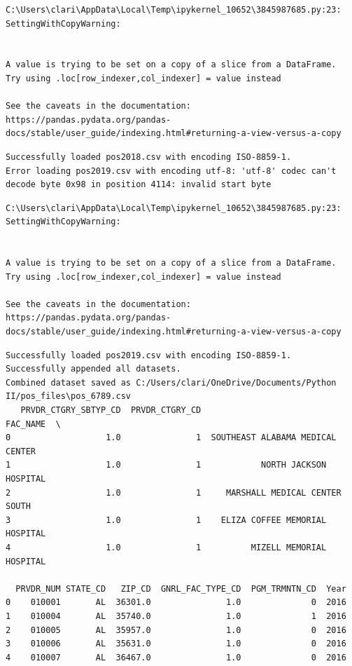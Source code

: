 \documentclass[
  letterpaper,
  DIV=11,
  numbers=noendperiod]{scrartcl}
\begin{document}
\begin{verbatim}
C:\Users\clari\AppData\Local\Temp\ipykernel_10652\3845987685.py:23: SettingWithCopyWarning:


A value is trying to be set on a copy of a slice from a DataFrame.
Try using .loc[row_indexer,col_indexer] = value instead

See the caveats in the documentation: https://pandas.pydata.org/pandas-docs/stable/user_guide/indexing.html#returning-a-view-versus-a-copy
\end{verbatim}

\begin{verbatim}
Successfully loaded pos2018.csv with encoding ISO-8859-1.
Error loading pos2019.csv with encoding utf-8: 'utf-8' codec can't decode byte 0x98 in position 4114: invalid start byte
\end{verbatim}

\begin{verbatim}
C:\Users\clari\AppData\Local\Temp\ipykernel_10652\3845987685.py:23: SettingWithCopyWarning:


A value is trying to be set on a copy of a slice from a DataFrame.
Try using .loc[row_indexer,col_indexer] = value instead

See the caveats in the documentation: https://pandas.pydata.org/pandas-docs/stable/user_guide/indexing.html#returning-a-view-versus-a-copy
\end{verbatim}

\begin{verbatim}
Successfully loaded pos2019.csv with encoding ISO-8859-1.
Successfully appended all datasets.
Combined dataset saved as C:/Users/clari/OneDrive/Documents/Python II/pos_files\pos_6789.csv
   PRVDR_CTGRY_SBTYP_CD  PRVDR_CTGRY_CD                          FAC_NAME  \
0                   1.0               1  SOUTHEAST ALABAMA MEDICAL CENTER   
1                   1.0               1            NORTH JACKSON HOSPITAL   
2                   1.0               1     MARSHALL MEDICAL CENTER SOUTH   
3                   1.0               1    ELIZA COFFEE MEMORIAL HOSPITAL   
4                   1.0               1          MIZELL MEMORIAL HOSPITAL   

  PRVDR_NUM STATE_CD   ZIP_CD  GNRL_FAC_TYPE_CD  PGM_TRMNTN_CD  Year  
0    010001       AL  36301.0               1.0              0  2016  
1    010004       AL  35740.0               1.0              1  2016  
2    010005       AL  35957.0               1.0              0  2016  
3    010006       AL  35631.0               1.0              0  2016  
4    010007       AL  36467.0               1.0              0  2016  
\end{verbatim}
\end{document}
